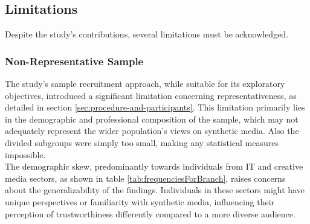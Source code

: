 \documentclass[
  a4paper,  %
  twoside,  %
  bibliography=totoc,
  headsepline,
  cleardoublepage=empty,
  parskip=half,
  draft=false
]{scrbook}
\begin{document}
\subsection{Limitations}
\label{subsec:limitations}
Despite the study's contributions, several limitations must be acknowledged.

\subsubsection{Non-Representative Sample}
The study's sample recruitment approach, while suitable for its exploratory objectives, introduced a significant limitation concerning representativeness, as detailed in section \ref{sec:procedure-and-participants}. This limitation primarily lies in the demographic and professional composition of the sample, which may not adequately represent the wider population's views on synthetic media. 
Also the divided subgroups were simply too small, making any statistical measures impossible. \\
The demographic skew, predominantly towards individuals from IT and creative media sectors, as shown in table \ref{tab:frequenciesForBranch}, raises concerns about the generalizability of the findings. Individuals in these sectors might have unique perspectives or familiarity with synthetic media, influencing their perception of trustworthiness differently compared to a more diverse audience.
\end{document}
